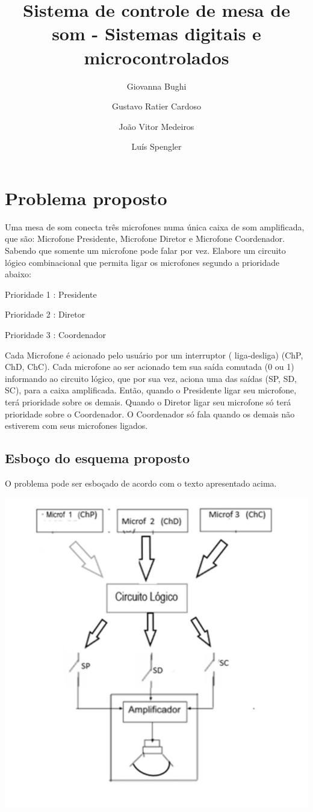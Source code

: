 \documentclass{article}
\title{Sistema de controle de mesa de som - Sistemas digitais e microcontrolados}
\date{}
\author[1]{Giovanna Bughi}
\author[2]{Gustavo Ratier Cardoso}
\author[3]{João Vitor Medeiros}
\author[4]{Luís Spengler}
\affil[1,2,3,4]{Instituto Federal de Educação, Ciência e Tecnologia de Mato Grosso do Sul}
\begin{document}
\maketitle

\tableofcontents

\medskip

\section{Problema proposto}
Uma mesa de som conecta três microfones numa única caixa de som amplificada, que são: Microfone Presidente, Microfone Diretor e Microfone Coordenador. Sabendo que somente um microfone pode falar por vez. Elabore um circuito lógico combinacional que permita ligar os microfones segundo a prioridade abaixo:

Prioridade 1 : Presidente         

Prioridade 2 : Diretor

Prioridade 3 : Coordenador

Cada Microfone é acionado pelo usuário por um interruptor  ( liga-desliga) (ChP, ChD, ChC). Cada microfone  ao ser acionado tem sua saída  comutada (0 ou 1) informando ao circuito lógico,  que por sua vez, aciona uma das  saídas (SP, SD, SC), para a caixa amplificada. Então, quando o Presidente ligar seu microfone, terá prioridade sobre os demais. Quando o Diretor ligar seu microfone só terá prioridade sobre o  Coordenador. O Coordenador só fala quando os demais não estiverem com seus microfones ligados.

\subsection{Esboço do esquema proposto}
O problema pode ser esboçado de acordo com o texto apresentado acima.

\includegraphics[width=\textwidth]{esbocoroubado}
\end{document}
